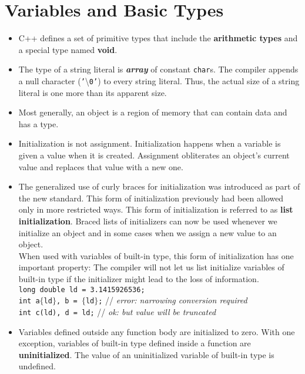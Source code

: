 \section{Variables and Basic Types}
\begin{itemize}

\item C++ defines a set of primitive types that include the \textbf{arithmetic types} and a special type named \textbf{void}.

\item The type of a string literal is \textbf{\textit{array}} of constant \texttt{char}s. The compiler appends a null character (\texttt{'}\textbackslash\texttt{0'}) to every string literal. Thus, the actual size of a string literal is one more than its apparent size.

\item Most generally, an object is a region of memory that can contain data and has a type.

\item Initialization is not assignment. Initialization happens when a variable is given a value when it is created. Assignment obliterates an object's current value and replaces that value with a new one.

\item The generalized use of curly braces for initialization was introduced as part of the new standard. This form of initialization previously had been allowed only in more restricted ways. This form of initialization is referred to as \textbf{list initialization}. Braced lists of initializers can now be used whenever we initialize an object and in some cases when we assign a new value to an object.\\When used with variables of built-in type, this form of initialization has one important property: The compiler will not let us list initialize variables of built-in type if the initializer might lead to the loss of information.\\\hspace*{1em}\texttt{long double ld = 3.1415926536;}\\\hspace*{1em}\texttt{int a$\{$ld$\}$, b = $\{$ld$\}$;} // \textit{error: narrowing conversion required}\\\hspace*{1em}\texttt{int c(ld), d = ld;} // \textit{ok: but value will be truncated}

\item Variables defined outside any function body are initialized to zero. With one exception, variables of built-in type defined inside a function are \textbf{uninitialized}. The value of an uninitialized variable of built-in type is undefined.


\end{itemize}
